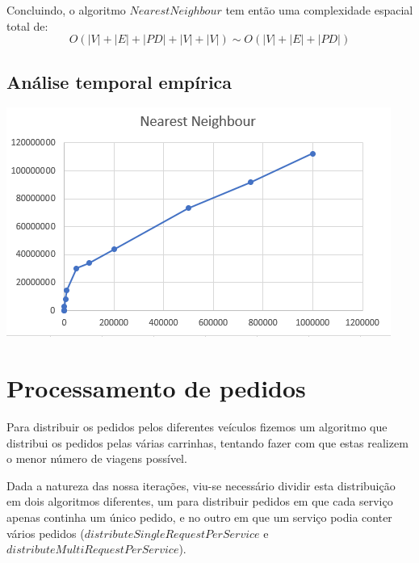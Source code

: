 \documentclass[article, a4paper, 12pt, oneside]{memoir}
\begin{document}
Concluindo, o algoritmo $NearestNeighbour$ tem então uma complexidade espacial total de:
\begin{equation}
O(|V|+|E|+|PD|+|V|+|V|) \sim O(|V|+|E|+|PD|)
\end{equation}

\subsection{Análise temporal empírica}

\begin{center}
\includegraphics[scale=0.5]{nearest_empiric.png}
\end{center}

\section{Processamento de pedidos}
Para distribuir os pedidos pelos diferentes veículos fizemos um algoritmo que distribui os pedidos pelas várias carrinhas,
tentando fazer com que estas realizem o menor número de viagens possível.

Dada a natureza das nossa iterações, viu-se necessário dividir esta distribuição em dois algoritmos diferentes, um para distribuir pedidos em que cada serviço apenas continha um único pedido, e no outro em que um serviço podia conter vários pedidos ($distributeSingleRequestPerService$ e $distributeMultiRequestPerService$).
\end{document}

